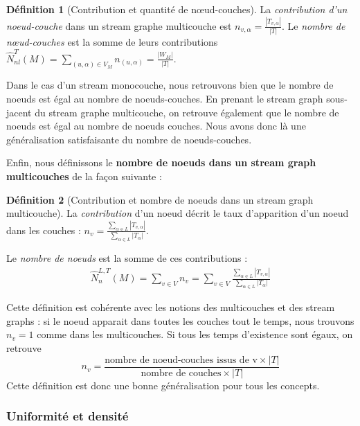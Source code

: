 \documentclass[11pt,a4paper]{article}
\theoremstyle{definition}
\newtheorem{defn}{Définition}
\theoremstyle{remark}
\theoremstyle{remark}
\begin{document}
	\begin{defn}[Contribution et quantité de nœud-couches]
	La {\em contribution d'un noeud-couche} dans un stream graphe multicouche est $n_{v,\alpha} = \frac{|T_{v,\alpha}|}{|T|}$. Le {\em nombre de nœud-couches} est la somme de leurs contributions $\hat{N}^{T}_{nl}(M) = \underset{(u,\alpha)\in V_M}{\sum} n_{(u,\alpha)} = \frac{|W_M|}{|T|}$.
    \end{defn}
	
	Dans le cas d'un stream monocouche, nous retrouvons bien que le nombre de noeuds est égal au nombre de noeuds-couches. En prenant le stream graph sous-jacent du stream graphe multicouche, on retrouve également que le nombre de noeuds est égal au nombre de noeuds couches. Nous avons donc là une généralisation satisfaisante du nombre de noeuds-couches.
    
   Enfin, nous définissons le \textbf{nombre de noeuds dans un stream graph multicouches} de la façon suivante : 
    
    \begin{defn}[Contribution et nombre de noeuds dans un stream graph multicouche]
    La {\em contribution} d'un noeud décrit le taux d'apparition d'un noeud dans les couches : $n_v = \frac{\sum_{\alpha \in L}|T_{v,\alpha}|}{\sum_{\alpha \in L} |T_{\alpha}|}$.
    
    Le {\em nombre de noeuds} est la somme de ces contributions :
    \begin{align}
    \hat{N}^{L,T}_n(M) = \sum_{v\in V} n_v= \sum_{v\in V} \frac{\sum_{\alpha \in L}|T_{v,\alpha}|}{\sum_{\alpha \in L} |T_{\alpha}|} 
    \label{numberNodes}
	\end{align}     
	
	\end{defn}
	
	Cette définition est cohérente avec les notions des multicouches et des stream graphs : si le noeud apparait dans toutes les couches tout le temps, nous trouvons $n_v=1$ comme dans les multicouches. Si tous les temps d'existence sont égaux, on retrouve $$n_v=\frac{\text{nombre de noeud-couches issus de v}\times |T|}{\text{nombre de couches}\times |T|}$$ Cette définition est donc une bonne généralisation pour tous les concepts.

	


	\subsubsection{Uniformité et densité}
	
\end{document}

